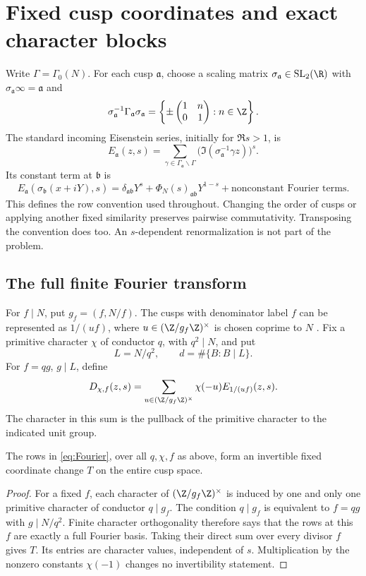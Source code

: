 \section{Fixed cusp coordinates and exact character blocks}\label{sec:fixed}

Write \(\Gamma=\Gamma_0(N)\). For each cusp \(\mathfrak a\), choose
a scaling matrix \(\sigma_{\mathfrak a}\in\mathrm{SL}_2(\R)\) with
\(\sigma_{\mathfrak a}\infty=\mathfrak a\) and
\[
 \sigma_{\mathfrak a}^{-1}\Gamma_{\mathfrak a}\sigma_{\mathfrak a}
 =\left\{\pm\begin{pmatrix}1&n\\0&1\end{pmatrix}:n\in\Z\right\}.
\]
The standard incoming Eisenstein series, initially for \(\Re s>1\), is
\[
 E_{\mathfrak a}(z,s)=
 \sum_{\gamma\in\Gamma_{\mathfrak a}\backslash\Gamma}
       \bigl(\Im(\sigma_{\mathfrak a}^{-1}\gamma z)\bigr)^s .
\]
Its constant term at \(\mathfrak b\) is
\[
 E_{\mathfrak a}(\sigma_{\mathfrak b}(x+iY),s)
 =\delta_{\mathfrak a\mathfrak b}Y^s+
   \Phi_N(s)_{\mathfrak a\mathfrak b}Y^{1-s}
   +\text{nonconstant Fourier terms}.
\]
This defines the row convention used throughout. Changing the order of
cusps or applying another fixed similarity preserves pairwise
commutativity. Transposing the convention does too. An \(s\)-dependent
renormalization is not part of the problem.

\subsection{The full finite Fourier transform}

For \(f\mid N\), put \(g_f=(f,N/f)\). The cusps with denominator
label \(f\) can be represented as \(1/(uf)\), where
\(u\in(\Z/g_f\Z)^\times\) is chosen coprime to \(N\)
\citep[Section 5.2]{Young2019}. Fix a primitive character \(\chi\)
of conductor \(q\), with \(q^2\mid N\), and put
\[
 L=N/q^2,\qquad d=\#\{B:B\mid L\}.
\]
For \(f=qg\), \(g\mid L\), define
\begin{equation}\label{eq:Fourier}
 D_{\chi,f}(z,s)=
 \sum_{u\in(\Z/g_f\Z)^\times}\chi(-u)E_{1/(uf)}(z,s).
\end{equation}
The character in this sum is the pullback of the primitive character to
the indicated unit group.

\begin{lemma}\label{lem:full-Fourier}
The rows in \eqref{eq:Fourier}, over all \(q,\chi,f\) as above, form
an invertible fixed coordinate change \(T\) on the entire cusp space.
\end{lemma}
\begin{proof}
For a fixed \(f\), each character of \((\Z/g_f\Z)^\times\) is induced
by one and only one primitive character of conductor \(q\mid g_f\).
The condition \(q\mid g_f\) is equivalent to \(f=qg\) with
\(g\mid N/q^2\). Finite character orthogonality therefore says that
the rows at this \(f\) are exactly a full Fourier basis. Taking their
direct sum over every divisor \(f\) gives \(T\). Its entries are
character values, independent of \(s\). Multiplication by the
nonzero constants \(\chi(-1)\) changes no invertibility statement.
\end{proof}

